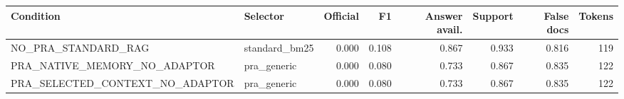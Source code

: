 \begin{tabular}{llrrrrrr}
\toprule
Condition & Selector & Official & F1 & Answer avail. & Support & False docs & Tokens \\
\midrule
NO\_PRA\_STANDARD\_RAG & standard\_bm25 & 0.000 & 0.108 & 0.867 & 0.933 & 0.816 & 119 \\
PRA\_NATIVE\_MEMORY\_NO\_ADAPTOR & pra\_generic & 0.000 & 0.080 & 0.733 & 0.867 & 0.835 & 122 \\
PRA\_SELECTED\_CONTEXT\_NO\_ADAPTOR & pra\_generic & 0.000 & 0.080 & 0.733 & 0.867 & 0.835 & 122 \\
\bottomrule
\end{tabular}
